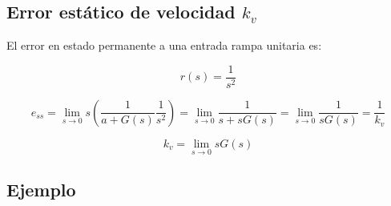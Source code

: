 

        \subsection{Error estático de velocidad $k_v$}
            El error en estado permanente a una entrada rampa unitaria es:

            \begin{equation*}
                r(s) = \frac{1}{s^2}
            \end{equation*}

            \begin{equation*}
                e_{ss} = \lim_{s \to 0} s \left( \frac{1}{a + G(s)} \frac{1}{s^2} \right) = \lim_{s \to 0} \frac{1}{s + s G(s)} = \lim_{s \to 0} \frac{1}{s G(s)} = \frac{1}{k_v}
            \end{equation*}

            \begin{equation*}
                k_v = \lim_{s \to 0} s G(s)
            \end{equation*}



        \subsection{Ejemplo}
